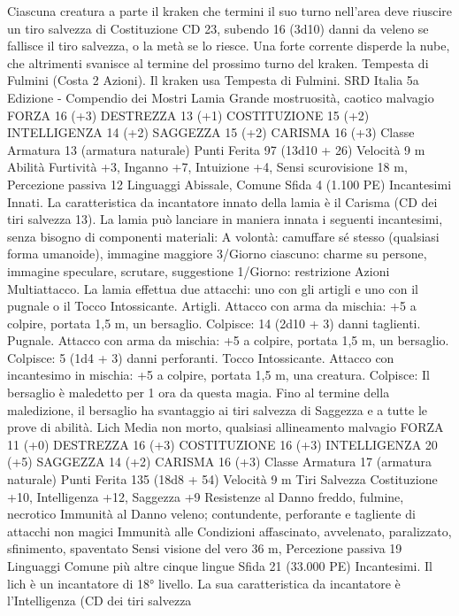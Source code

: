 \begin{multicols}{2}
Ciascuna creatura a parte il kraken che termini il suo turno
nell’area deve riuscire un tiro salvezza di Costituzione CD 23,
subendo 16 (3d10) danni da veleno se fallisce il tiro salvezza, o
la metà se lo riesce. Una forte corrente disperde la nube, che
altrimenti svanisce al termine del prossimo turno del kraken.
Tempesta di Fulmini (Costa 2 Azioni). Il kraken usa Tempesta
di Fulmini.
SRD Italia 5a Edizione - Compendio dei Mostri
Lamia
Grande mostruosità, caotico malvagio
FORZA 16 (+3)
DESTREZZA 13 (+1)
COSTITUZIONE 15 (+2)
INTELLIGENZA 14 (+2)
SAGGEZZA 15 (+2)
CARISMA 16 (+3)
Classe Armatura 13 (armatura naturale)
Punti Ferita 97 (13d10 + 26)
Velocità 9 m
Abilità Furtività +3, Inganno +7, Intuizione +4,
Sensi scurovisione 18 m, Percezione passiva 12
Linguaggi Abissale, Comune
Sfida 4 (1.100 PE)
Incantesimi Innati. La caratteristica da incantatore innato della
lamia è il Carisma (CD dei tiri salvezza 13). La lamia può
lanciare in maniera innata i seguenti incantesimi, senza bisogno
di componenti materiali:
A volontà: camuffare sé stesso (qualsiasi forma umanoide),
immagine maggiore
3/Giorno ciascuno: charme su persone, immagine speculare,
scrutare, suggestione
1/Giorno: restrizione
Azioni
Multiattacco. La lamia effettua due attacchi: uno con gli artigli e
uno con il pugnale o il Tocco Intossicante.
Artigli. Attacco con arma da mischia: +5 a colpire, portata 1,5
m, un bersaglio.
Colpisce: 14 (2d10 + 3) danni taglienti.
Pugnale. Attacco con arma da mischia: +5 a colpire, portata 1,5
m, un bersaglio.
Colpisce: 5 (1d4 + 3) danni perforanti.
Tocco Intossicante. Attacco con incantesimo in mischia: +5 a
colpire, portata 1,5 m, una creatura.
Colpisce: Il bersaglio è maledetto per 1 ora da questa magia.
Fino al termine della maledizione, il bersaglio ha svantaggio ai
tiri salvezza di Saggezza e a tutte le prove di abilità.
Lich
Media non morto, qualsiasi allineamento malvagio
FORZA 11 (+0)
DESTREZZA 16 (+3)
COSTITUZIONE 16 (+3)
INTELLIGENZA 20 (+5)
SAGGEZZA 14 (+2)
CARISMA 16 (+3)
Classe Armatura 17 (armatura naturale)
Punti Ferita 135 (18d8 + 54)
Velocità 9 m
Tiri Salvezza Costituzione +10, Intelligenza +12, Saggezza +9
Resistenze al Danno freddo, fulmine, necrotico
Immunità al Danno veleno; contundente, perforante e tagliente
di attacchi non magici
Immunità alle Condizioni affascinato, avvelenato, paralizzato,
sfinimento, spaventato
Sensi visione del vero 36 m, Percezione passiva 19
Linguaggi Comune più altre cinque lingue
Sfida 21 (33.000 PE)
Incantesimi. Il lich è un incantatore di 18° livello. La sua
caratteristica da incantatore è l’Intelligenza (CD dei tiri salvezza

\end{multicols}
